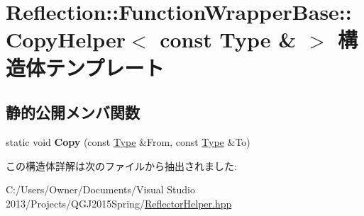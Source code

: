 \hypertarget{struct_reflection_1_1_function_wrapper_base_1_1_copy_helper_3_01const_01_type_01_6_01_4}{}\section{Reflection\+:\+:Function\+Wrapper\+Base\+:\+:Copy\+Helper$<$ const Type \& $>$ 構造体テンプレート}
\label{struct_reflection_1_1_function_wrapper_base_1_1_copy_helper_3_01const_01_type_01_6_01_4}
\subsection*{静的公開メンバ関数}
\begin{DoxyCompactItemize}
\item 
static void {\bfseries Copy} (const \hyperlink{class_reflection_1_1_type}{Type} \&From, const \hyperlink{class_reflection_1_1_type}{Type} \&To)\hypertarget{struct_reflection_1_1_function_wrapper_base_1_1_copy_helper_3_01const_01_type_01_6_01_4_ac97a28bbe2de1b3b9db4a56353061adf}{}\label{struct_reflection_1_1_function_wrapper_base_1_1_copy_helper_3_01const_01_type_01_6_01_4_ac97a28bbe2de1b3b9db4a56353061adf}

\end{DoxyCompactItemize}


この構造体詳解は次のファイルから抽出されました\+:\begin{DoxyCompactItemize}
\item 
C\+:/\+Users/\+Owner/\+Documents/\+Visual Studio 2013/\+Projects/\+Q\+G\+J2015\+Spring/\hyperlink{_reflector_helper_8hpp}{Reflector\+Helper.\+hpp}\end{DoxyCompactItemize}

